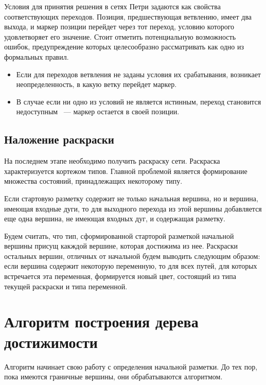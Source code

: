 Условия для принятия решения в сетях Петри задаются как свойства соответствующих переходов. Позиция, предшествующая ветвлению, имеет два выхода, и маркер позиции перейдет через тот переход, условию которого удовлетворяет его значение. Стоит отметить потенциальную возможность ошибок, предупреждение которых целесообразно рассматривать как одно из формальных правил.
\begin{itemize}
\item Если для переходов ветвления не заданы условия их срабатывания, возникает неопределенность, в какую ветку перейдет маркер.
\item В случае если ни одно из условий не является истинным, переход становится недоступным ~--- маркер остается в своей позиции.
\end{itemize}

\subsection{Наложение раскраски}

На последнем этапе необходимо получить раскраску сети. Раскраска характеризуется кортежом типов. Главной проблемой является формирование множества состояний, принадлежащих некоторому типу.

Если стартовую разметку содержит не только начальная вершина, но и вершина, имеющая входные дуги, то для выходного перехода из этой вершины добавляется еще одна вершина, не имеющая входных дуг, и содержащая разметку.

Будем считать, что тип, сформированной старторой разметкой начальной вершины присущ какждой вершине, которая достижима из нее. Раскраски остальных вершин, отличных от начальной будем выводить следующим образом: если вершина содержит некоторую переменную, то для всех путей, для которых встречается эта переменная, формируется новый цвет, состоящий из типа текущей раскраски и типа переменной.

\section{Алгоритм построения дерева достижимости}

Алгоритм начинает свою работу с определения начальной разметки. До тех пор, пока имеются граничные вершины, они обрабатываются алгоритмом.

